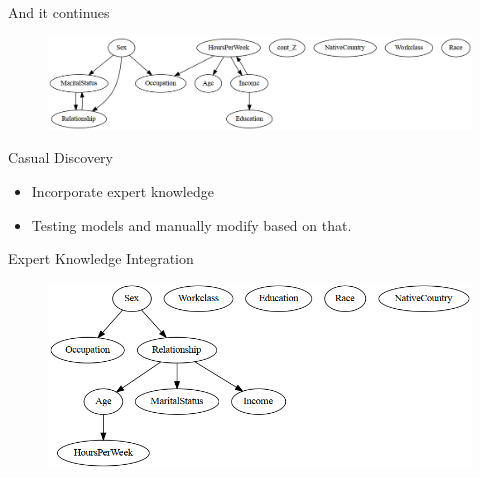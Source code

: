 \documentclass{beamer}
\begin{document}
\begin{frame}{And it continues}
	\begin{figure}
		\centering
		\includegraphics[scale=0.4]{imgs/adult_pillai.png}
	\end{figure}
\end{frame}

\begin{frame}{Casual Discovery}




	\vspace{2em}

	\begin{itemize}
		\item Incorporate expert knowledge
		\item Testing models and manually modify based on that.
	\end{itemize}

\end{frame}

\begin{frame}{Expert Knowledge Integration}
	\begin{figure}
		\centering
		\includegraphics[scale=0.4]{imgs/adult_bic_blacklist.png}
	\end{figure}
\end{frame}
\end{document}
